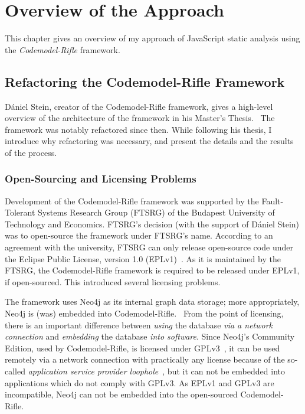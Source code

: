 \chapter{Overview of the Approach}

This chapter gives an overview of my approach of JavaScript static analysis using the \emph{Codemodel-Rifle} framework.


\section{Refactoring the Codemodel-Rifle Framework}

Dániel Stein, creator of the Codemodel-Rifle framework, gives a high-level overview of the architecture of the framework in his Master's Thesis.~\cite{stein-daniel-msc} The framework was notably refactored since then. While following his thesis, I introduce why refactoring was necessary, and present the details and the results of the process.


\subsection{Open-Sourcing and Licensing Problems}

Development of the Codemodel-Rifle framework was supported by the Fault-Tolerant Systems Research Group (FTSRG) of the Budapest University of Technology and Economics. FTSRG's decision (with the support of Dániel Stein) was to open-source the framework under FTSRG's name. According to an agreement with the university, FTSRG can only release open-source code under the Eclipse Public License, version 1.0 (EPLv1)~\cite{eplv1}. As it is maintained by the FTSRG, the Codemodel-Rifle framework is required to be released under EPLv1, if open-sourced. This introduced several licensing problems.~\cite{codemodel-rifle-licensing}

The framework uses Neo4j as its internal graph data storage; more appropriately, Neo4j is (was) embedded into Codemodel-Rifle.~\cite{stein-daniel-msc} From the point of licensing, there is an important difference between \emph{using} the database \emph{via a network connection} and \emph{embedding} the database \emph{into software}. Since Neo4j's Community Edition, used by Codemodel-Rifle, is licensed under GPLv3~\cite{neo4j-licensing}, it can be used remotely via a network connection with practically any license because of the so-called \emph{application service provider loophole}~\cite{asp-loophole}, but it can not be embedded into applications which do not comply with GPLv3. As EPLv1 and GPLv3 are incompatible, Neo4j can not be embedded into the open-sourced Codemodel-Rifle.

